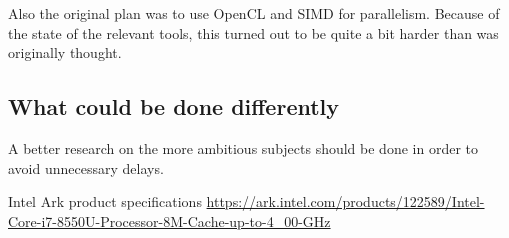 \documentclass[a4paper]{article}
\begin{document}
Also the original plan was to use OpenCL and SIMD for parallelism. Because of the state of the relevant tools, this turned out to be quite a bit harder than was originally thought.
\subsection{What could be done differently}
A better research on the more ambitious subjects should be done in order to avoid unnecessary delays.

\begin{thebibliography}{9}

	Intel
	Ark product specifications
	\url{https://ark.intel.com/products/122589/Intel-Core-i7-8550U-Processor-8M-Cache-up-to-4_00-GHz}
	
\end{thebibliography}
\end{document}
